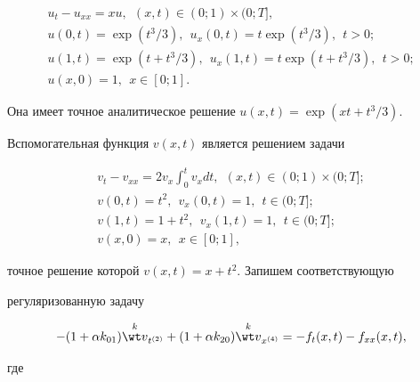 \begin{gather*} 


u_t-u_{xx}=x u,\ \ (x,t)\in(0;1)\times(0;T], \\ 


% 


u(0,t)=\exp(t^3/3),\ \ u_x(0,t)=t\exp(t^3/3),\ \ t>0; \\ 


% 


u(1,t)=\exp(t+t^3/3),\ \ u_x(1,t)=t\exp(t+t^3/3),\ \ t>0; \\ 


% 


u(x,0)=1,\ \ x\in[0;1]. 


\end{gather*} 


Она имеет точное аналитическое решение $u(x,t)=\exp(x t+t^3/3)$. 


 


Вспомогательная функция $v(x,t)$ является решением задачи 


\begin{gather*} 


v_t-v_{xx}=2v_x\int^t_0 v_x dt, \ \ (x,t)\in(0;1) 


\times(0;T]; \\ 


% 


v(0,t)=t^2,\ \ v_x(0,t)=1,\ \ t\in(0;T]; \\ 


% 


v(1,t)=1+t^2,\ \ v_x(1,t)=1,\ \ t\in(0;T]; \\ 


% 


v(x,0)=x,\ \ x\in[0;1], 


\end{gather*} 


точное решение которой $v(x,t)=x+t^2$. Запишем соответствующую 


регуляризованную задачу 


$$ 


-(1+\alpha k_{01})\up{k}{\wt v}_{t^{(2)}} 


+(1+\alpha k_{20})\up{k}{\wt v}_{x^{(4)}}=-f_t(x,t) 


-f_{xx}(x,t), 


$$ 


где 



